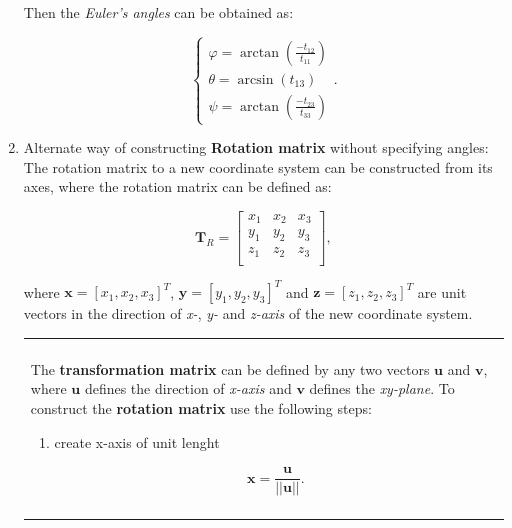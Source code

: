 \documentclass[10pt,b5paper,titlepage]{book}
\newenvironment{bbox}[1][0.96]
{
    \begin{center}
        \begin{tabular}{|p{#1\textwidth}|}
            \hline\\
}
{
            \\\\\hline
        \end{tabular}
    \end{center}
}
\begin{document}
\begin{enumerate}
        Then the \textit{Euler's angles} can be obtained as:

        \begin{equation}
            \left\{ \begin{array}{l}
                \varphi = \arctan \left( \frac{-t_{12}}{t_{11}} \right)\\
                \theta = \arcsin \left( t_{13} \right) \\
                \psi = \arctan \left( \frac{-t_{23}}{t_{33}} \right)
            \end{array} \right.
        .\end{equation}


    \item Alternate way of constructing \textbf{Rotation matrix} without specifying
        angles:\\

        The rotation matrix to a new coordinate system can be constructed from
        its axes, where the rotation matrix can be defined as:

        \begin{equation}
            \mathbf{T}_{R} = \begin{bmatrix}
                x_1 & x_2 & x_3 \\
                y_1 & y_2 & y_3 \\
                z_1 & z_2 & z_3 \\
            \end{bmatrix}
        ,\end{equation}

        where $\mathbf{x} = [x_1, x_2, x_3]^{T}$, $\mathbf{y} = [y_1, y_2, y_3]^{T}$
        and  $\mathbf{z} = [z_1, z_2, z_3]^{T}$ are unit vectors in the direction
        of \textit{x-}, \textit{y-} and \textit{z-axis} of the new coordinate
        system.


        \begin{bbox}
            The \textbf{transformation matrix} can be defined by any two vectors
            $\mathbf{u}$ and $\mathbf{v}$, where $\mathbf{u}$ defines the direction
            of \textit{x-axis} and $\mathbf{v}$ defines the \textit{xy-plane}.
            To construct the \textbf{rotation matrix} use the following steps:

            \begin{enumerate}
                \item create x-axis of unit lenght

                    \begin{equation}
                        \mathbf{x} = \frac{\mathbf{u}}{||\mathbf{u}||}
                    .\end{equation}


\end{enumerate}
\end{bbox}
\end{enumerate}
\end{document}
